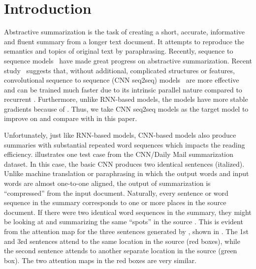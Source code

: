 \section{Introduction}
\label{sec:intro}

Abstractive summarization is the task of creating a short, accurate,
informative and fluent summary from a longer text document.
It attempts to reproduce the semantics and topics of original text
by paraphrasing. 
Recently, sequence to sequence
models~\cite{RushCW15,ChopraAR16,NallapatiZSGX16,SeeLM17,PaulusXS17}
have made great progress on abstractive summarization.
Recent study~\cite{bai2018empirical} suggests that, 
without additional, complicated structures or features,
convolutional sequence to sequence 
(CNN seq2seq) models~\cite{gehring2017convs2s,FanGA18,LiuLZ18} 
are more effective and can be trained much faster due to 
its intrinsic parallel nature 
compared to recurrent \DIFdelbegin {}\DIFdelend \DIFaddbegin {}\DIFaddend .
Furthermore, unlike RNN-based models, 
the \DIFdelbegin {}\DIFdelend \DIFaddbegin {}\DIFaddend models have more stable gradients 
because of \DIFdelbegin {}\DIFdelend \DIFaddbegin {}\DIFaddend . 
Thus, we take CNN seq2seq models as the target model to improve on and
compare with
in this paper.

Unfortunately, just like RNN-based models, CNN-based models also produce
summaries with substantial repeated word sequences which impacts the reading efficiency.
 illustrates one 
test case from the CNN/Daily Mail summarization dataset. 
In this case, the basic CNN \DIFaddbegin {}\DIFaddend produces two 
identical sentences (italized)\DIFdelbegin {}\DIFdelend . 
Unlike machine translation or paraphrasing in which the output words
and input words are almost one-to-one aligned, the output of summarization
is ``compressed'' from the input document. Naturally, every sentence or 
word sequence in the summary corresponds to one or more places in the source
document. If there were two identical word sequences in the summary,
they might be looking at and summarizing the same ``spots'' in the source \DIFaddbegin {}\DIFaddend .
This is evident from the attention map for the three sentences generated by 
\DIFdelbegin {}\DIFdelend \DIFaddbegin {}\DIFaddend , shown in . 
The 1st and 3rd sentences attend to
the same location in the source (red boxes), while the second
sentence attends to another separate location in the source (green box). 
The two attention maps in the red boxes are very similar.


